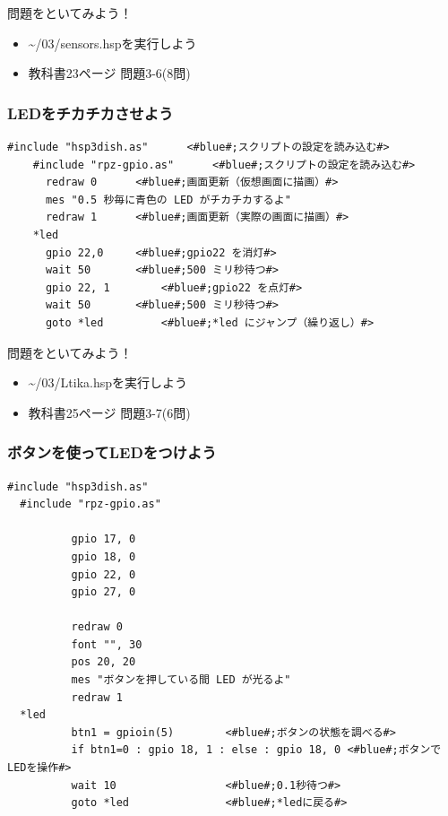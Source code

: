 \documentclass[slide03.tex]{subfiles}
\begin{document}
\begin{frame}
  \begin{exampleblock}{問題をといてみよう！}
    \begin{itemize}
      \item \sim/03/sensors.hspを実行しよう
      \item 教科書23ページ 問題3-6(8問)
    \end{itemize}
  \end{exampleblock}
\end{frame}


\begin{frame}[fragile]
  \frametitle{LEDをチカチカさせよう}
  \begin{lstlisting}[title=\sim/03/Ltika.hsp,label=Ltika.hsp]
    #include "hsp3dish.as"		<#blue#;スクリプトの設定を読み込む#>
    #include "rpz-gpio.as"		<#blue#;スクリプトの設定を読み込む#>
      redraw 0		<#blue#;画面更新（仮想画面に描画）#>
      mes "0.5 秒毎に青色の LED がチカチカするよ"
      redraw 1		<#blue#;画面更新（実際の画面に描画）#>
    *led
      gpio 22,0		<#blue#;gpio22 を消灯#>
      wait 50 		<#blue#;500 ミリ秒待つ#>
      gpio 22, 1 		<#blue#;gpio22 を点灯#>
      wait 50 		<#blue#;500 ミリ秒待つ#>
      goto *led 		<#blue#;*led にジャンプ（繰り返し）#>
  \end{lstlisting}
\end{frame}

\begin{frame}
  \begin{exampleblock}{問題をといてみよう！}
    \begin{itemize}
      \item \sim/03/Ltika.hspを実行しよう
      \item 教科書25ページ 問題3-7(6問)
    \end{itemize}
  \end{exampleblock}
\end{frame}

\begin{frame}[fragile]
  \frametitle{ボタンを使ってLEDをつけよう}
  \begin{lstlisting}[title=\sim/03/button\_led.hsp, label=button_led.hsp]
  #include "hsp3dish.as"
  #include "rpz-gpio.as"

          gpio 17, 0
          gpio 18, 0
          gpio 22, 0
          gpio 27, 0

          redraw 0
          font "", 30
          pos 20, 20
          mes "ボタンを押している間 LED が光るよ"
          redraw 1
  *led
          btn1 = gpioin(5)        <#blue#;ボタンの状態を調べる#>
          if btn1=0 : gpio 18, 1 : else : gpio 18, 0 <#blue#;ボタンでLEDを操作#>
          wait 10                 <#blue#;0.1秒待つ#>
          goto *led               <#blue#;*ledに戻る#>
  \end{lstlisting}
\end{frame}
\end{document}
